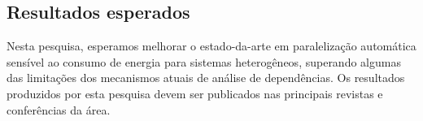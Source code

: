 \documentclass[a4paper,12pt]{article}
\newcommand\FIXME[1]{\textcolor{red}{FIX:}\textcolor{red}{#1}}
\begin{document}
\subsection{Resultados esperados}

Nesta pesquisa, esperamos melhorar o estado-da-arte em paralelização automática sensível ao consumo de energia para sistemas heterogêneos, superando algumas das limitações dos mecanismos atuais de análise de dependências. Os resultados produzidos por esta pesquisa devem ser publicados nas principais revistas e conferências da área.




\end{document}
